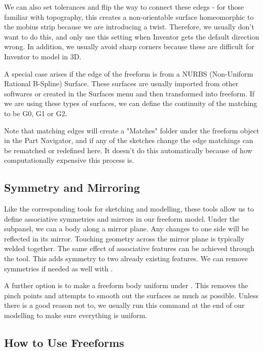 We can also set tolerances and flip the way to connect these edegs - for those familiar with topography, this creates a non-orientable surface homeomorphic to the mobius strip because we are introducing a twist. Therefore, we usually don't want to do this, and only use this setting when Inventor gets the default direction wrong. In addition, we usually avoid sharp corners because these are difficult for Inventor to model in 3D. 

A special case arises if the edge of the freeform is from a NURBS (Non-Uniform Rational B-Spline) Surface. These surfaces are usually imported from other softwares or created in the Surfaces menu and then transformed into freeform. If we are using these types of surfaces, we can define the continuity of the matching to be G0, G1 or G2.

Note that matching edges will create a "Matches" folder under the freeform object in the Part Navigator, and if any of the sketches change the edge matchings can be rematched or redefined here. It doesn't do this automatically because of how computationally expensive this process is. 


\label{subsection:freeform-symmetry}
\subsection{Symmetry and Mirroring}
\easydifficulty

Like the corresponding tools for sketching and modelling, these tools allow us to define associative symmetries and mirrors in our freeform model. Under the  subpanel, we can  a body along a mirror plane. Any changes to one side will be reflected in its mirror. Touching geometry across the mirror plane is typically welded together. The same effect of associative features can be achieved through the  tool. This adds symmetry to two already existing features. We can remove symmetries if needed as well with .

A further option is to make a freeform body uniform under . This removes the pinch points and attempts to smooth out the surfaces as much as possible. Unless there is a good reason not to, we usually run this command at the end of our modelling to make sure everything is uniform.

\subsection{How to Use Freeforms}

